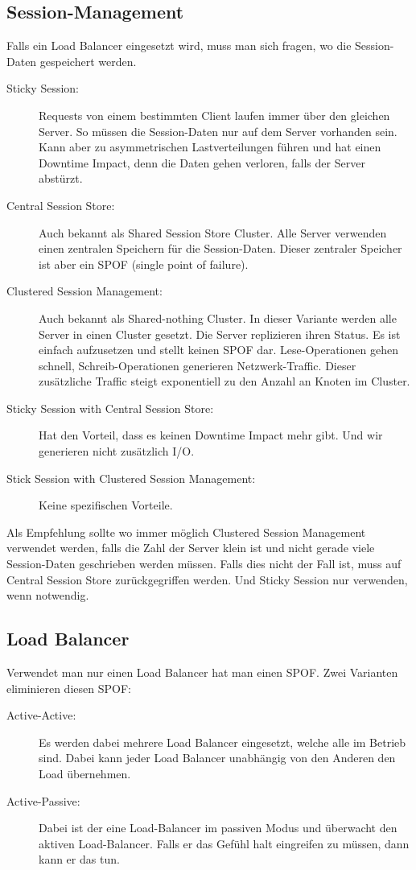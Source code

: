 \subsection{Session-Management}
Falls ein Load Balancer eingesetzt wird, muss man sich fragen, wo die Session-Daten gespeichert werden.
\begin{description}
	\item[Sticky Session:] Requests von einem bestimmten Client laufen immer über den gleichen Server. So müssen die Session-Daten nur auf dem Server vorhanden sein. Kann aber zu asymmetrischen Lastverteilungen führen und hat einen Downtime Impact, denn die Daten gehen verloren, falls der Server abstürzt.
	\item[Central Session Store:] Auch bekannt als Shared Session Store Cluster. Alle Server verwenden einen zentralen Speichern für die Session-Daten. Dieser zentraler Speicher ist aber ein SPOF (single point of failure).
	\item[Clustered Session Management:] Auch bekannt als Shared-nothing Cluster. In dieser Variante werden alle Server in einen Cluster gesetzt. Die Server replizieren ihren Status. Es ist einfach aufzusetzen und stellt keinen SPOF dar. Lese-Operationen gehen schnell, Schreib-Operationen generieren Netzwerk-Traffic. Dieser zusätzliche Traffic steigt exponentiell zu den Anzahl an Knoten im Cluster.
	\item[Sticky Session with Central Session Store:] Hat den Vorteil, dass es keinen Downtime Impact mehr gibt. Und wir generieren nicht zusätzlich I/O.
	\item[Stick Session with Clustered Session Management:] Keine spezifischen Vorteile.
\end{description}
Als Empfehlung sollte wo immer möglich Clustered Session Management verwendet werden, falls die Zahl der Server klein ist und nicht gerade viele Session-Daten geschrieben werden müssen. Falls dies nicht der Fall ist, muss auf Central Session Store zurückgegriffen werden. Und Sticky Session nur verwenden, wenn notwendig.

\subsection{Load Balancer}
Verwendet man nur einen Load Balancer hat man einen SPOF. Zwei Varianten eliminieren diesen SPOF:
\begin{description}
	\item[Active-Active:] Es werden dabei mehrere Load Balancer eingesetzt, welche alle im Betrieb sind. Dabei kann jeder Load Balancer unabhängig von den Anderen den Load übernehmen.
	\item[Active-Passive:] Dabei ist der eine Load-Balancer im passiven Modus und überwacht den aktiven Load-Balancer. Falls er das Gefühl halt eingreifen zu müssen, dann kann er das tun.
\end{description}

